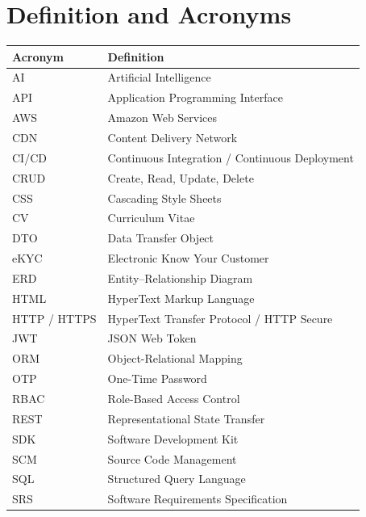 \newpage
\section*{Definition and Acronyms}

\begin{center}
\renewcommand{\arraystretch}{1.45}
\begin{longtable}{|L{3.5cm}|L{11.5cm}|}
\hline
{}\textbf{Acronym} & \textbf{Definition} \\ \hline
\endhead
AI & Artificial Intelligence \\ \hline
API & Application Programming Interface \\ \hline
AWS & Amazon Web Services \\ \hline
CDN & Content Delivery Network \\ \hline
CI/CD & Continuous Integration / Continuous Deployment \\ \hline
CRUD & Create, Read, Update, Delete \\ \hline
CSS & Cascading Style Sheets \\ \hline
CV & Curriculum Vitae \\ \hline
DTO & Data Transfer Object \\ \hline
eKYC & Electronic Know Your Customer \\ \hline
ERD & Entity--Relationship Diagram \\ \hline
HTML & HyperText Markup Language \\ \hline
HTTP / HTTPS & HyperText Transfer Protocol / HTTP Secure \\ \hline
JWT & JSON Web Token \\ \hline
ORM & Object-Relational Mapping \\ \hline
OTP & One-Time Password \\ \hline
RBAC & Role-Based Access Control \\ \hline
REST & Representational State Transfer \\ \hline
SDK & Software Development Kit \\ \hline
SCM & Source Code Management \\ \hline
SQL & Structured Query Language \\ \hline
SRS & Software Requirements Specification \\ \hline

\end{longtable}
\end{center}
